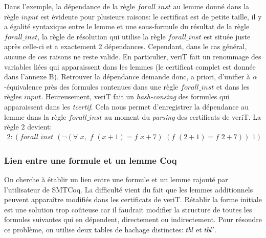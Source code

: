 \documentclass[11pt]{article}
\begin{document}
Dans l'exemple, la dépendance de la règle $forall\_inst$ au lemme donné dans la règle $input$ est évidente pour plusieurs raisons: le certificat est de petite taille, il y a égalité syntaxique entre le lemme et une sous-formule du résultat de la règle $forall\_inst$, la règle de résolution qui utilise la règle $forall\_inst$ est située juste après celle-ci et a exactement 2 dépendances. Cependant, dans le cas général, aucune de ces raisons ne reste valide. En particulier, veriT fait un renommage des variables liées qui apparaissent dans les lemmes (le certificat complet est donnée dans l'annexe B). Retrouver la dépendance demande donc, a priori, d'unifier à $\alpha$-équivalence près des formules contenues dans une règle $forall\_inst$ et dans les règles $input$. Heureusement, veriT fait un \textit{hash-consing} des formules qui apparaissent dans les \textit{tcertif}. Cela nous permet d'enregistrer la dépendance au lemme dans la règle $forall\_inst$ au moment du \textit{parsing} des certificats de veriT. La règle $2$ devient: 
\begin{align*}
2:(forall\_inst \,\, (\neg(\forall \,\,x, \,\,f \,\,(x+1) = f\,\,x+7) \,\,(f\,\, (2+1) = f\,\,2+7)) \,\,1) 
\end{align*}

\subsubsection{Lien entre une formule et un lemme Coq} \label{lien_formule_lemme}

On cherche à établir un lien entre une formule et un lemme rajouté par l'utilisateur de SMTCoq. La difficulté vient du fait que les lemmes additionnels peuvent apparaître modifiés dans les certificats de veriT. Rétablir la forme initiale est une solution trop coûteuse car il faudrait modifier la structure de toutes les formules suivantes qui en dépendent, directement ou indirectement. Pour résoudre ce problème, on utilise deux tables de hachage distinctes: $tbl$ et $tbl'$. \medbreak
\end{document}
